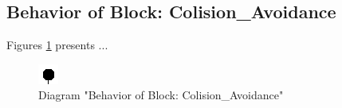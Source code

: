 \subsection{Behavior of Block: Colision\_Avoidance}
Figures \ref{fig:ColisionAvoidanceColisionAvoidance02} presents ...
\begin{figure}[htb]
\centering
\includegraphics[width=\textwidth]{img_0_2.png}
\caption{Diagram "Behavior of Block: Colision\_Avoidance"}
\label{fig:ColisionAvoidanceColisionAvoidance02}
\end{figure}

